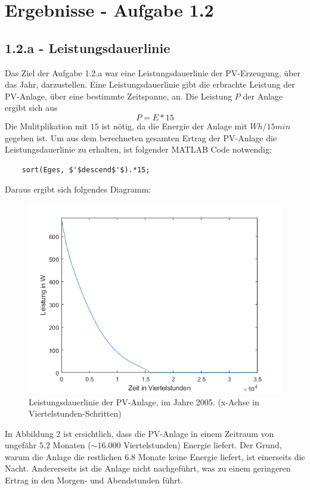 \documentclass[a4paper,12pt]{article}
\begin{document}
	\section{Ergebnisse - Aufgabe 1.2}
	\subsection{1.2.a - Leistungsdauerlinie}
	Das Ziel der Aufgabe 1.2.a war eine Leistungsdauerlinie der PV-Erzeugung, über das Jahr, darzustellen.\newline
	Eine Leistungsdauerlinie gibt die erbrachte Leistung der PV-Anlage, über eine bestimmte Zeitspanne, an.\newline
	Die Leistung $P$ der Anlage ergibt sich aus
	\begin{equation}
	P=E*15
	\end{equation}
	Die Mulitplikation mit $15$ ist nötig, da die Energie der Anlage mit $Wh/15min$ gegeben ist.\newline
	Um aus dem berechneten gesamten Ertrag der PV-Anlage die Leistungsdauerlinie zu erhalten, ist folgender MATLAB Code notwendig:
	\begin{lstlisting}
	sort(Eges, $'$descend$'$).*15;
	\end{lstlisting}
	Daraus ergibt sich folgendes Diagramm:
	\begin{figure}[H]
		\centering
		\includegraphics[width=12cm]{img/results/Leistungsdauerlinie}
		\caption{Leistungsdauerlinie der PV-Anlage, im Jahre 2005. (x-Achse in Viertelstunden-Schritten)}
	\end{figure}
	In Abbildung 2 ist ersichtlich, dass die PV-Anlage in einem Zeitraum von ungefähr $5.2$ Monaten ($\sim 16.000$ Viertelstunden) Energie liefert. Der Grund, warum die Anlage die restlichen $6.8$ Monate keine Energie liefert, ist einerseits die Nacht. Andererseits ist die Anlage nicht nachgeführt, was zu einem geringeren Ertrag in den Morgen- und Abendstunden führt.
\end{document}
